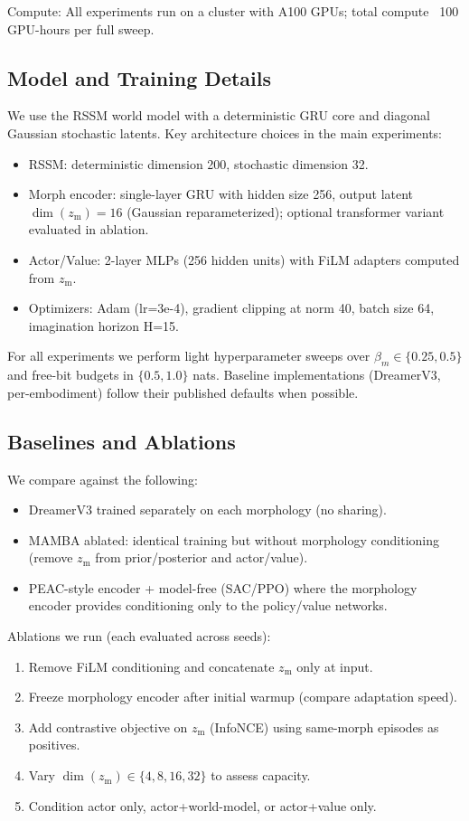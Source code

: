 \documentclass{article}
\begin{document}
Compute: All experiments run on a cluster with A100 GPUs; total compute ~100 GPU-hours per full sweep.

\subsection{Model and Training Details}
We use the RSSM world model with a deterministic GRU core and diagonal Gaussian stochastic latents. Key architecture choices in the main experiments:
\begin{itemize}
  \item RSSM: deterministic dimension 200, stochastic dimension 32.
  \item Morph encoder: single-layer GRU with hidden size 256, output latent $\dim(z_{\mathrm{m}})=16$ (Gaussian reparameterized); optional transformer variant evaluated in ablation.
  \item Actor/Value: 2-layer MLPs (256 hidden units) with FiLM adapters computed from $z_{\mathrm{m}}$.
  \item Optimizers: Adam (lr=3e-4), gradient clipping at norm 40, batch size 64, imagination horizon H=15.
\end{itemize}

For all experiments we perform light hyperparameter sweeps over $\beta_m\in\{0.25, 0.5\}$ and free-bit budgets in $\{0.5, 1.0\}$ nats. Baseline implementations (DreamerV3, per-embodiment) follow their published defaults when possible.

\subsection{Baselines and Ablations}
We compare against the following:
\begin{itemize}
  \item DreamerV3 trained separately on each morphology (no sharing).
  \item MAMBA ablated: identical training but without morphology conditioning (remove $z_{\mathrm{m}}$ from prior/posterior and actor/value).
  \item PEAC-style encoder + model-free (SAC/PPO) where the morphology encoder provides conditioning only to the policy/value networks.
\end{itemize}

Ablations we run (each evaluated across seeds):
\begin{enumerate}
  \item Remove FiLM conditioning and concatenate $z_{\mathrm{m}}$ only at input.
  \item Freeze morphology encoder after initial warmup (compare adaptation speed).
  \item Add contrastive objective on $z_{\mathrm{m}}$ (InfoNCE) using same-morph episodes as positives.
  \item Vary $\dim(z_{\mathrm{m}})\in\{4,8,16,32\}$ to assess capacity.
  \item Condition actor only, actor+world-model, or actor+value only.
\end{enumerate}
\end{document}
